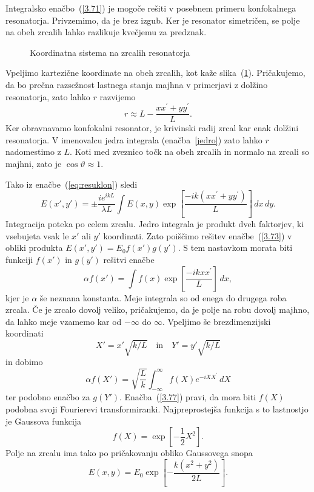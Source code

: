 Integralsko enačbo~(\ref{3.71}) je mogoče rešiti v posebnem primeru
konfokalnega resonatorja. Privzemimo, da je brez izgub. 
Ker je resonator simetričen, se polje na obeh zrcalih lahko razlikuje kvečjemu
za predznak.
\begin{figure}[h]
\centering
\def\svgwidth{110truemm} 

\caption{Koordinatna sistema na zrcalih resonatorja}
\label{fig:uklon_res_shema}
\end{figure}
Vpeljimo kartezične koordinate na obeh zrcalih, kot kaže slika~(\ref{fig:uklon_res_shema}).
Pričakujemo, da bo prečna razsežnost lastnega stanja majhna v primerjavi
z dolžino resonatorja, zato lahko $r$ razvijemo 
\begin{equation}
r\approx L-\frac{xx^{\prime}+yy^{\prime}}{L}.
\label{3.72}
\end{equation}
Ker obravnavamo konfokalni resonator, je krivinski radij zrcal kar enak dolžini resonatorja.
V imenovalcu jedra integrala (enačba~\ref{jedro}) zato lahko $r$ nadomestimo
z $L$. Koti med zveznico točk na obeh zrcalih in normalo na zrcali
so majhni, zato je  $\cos\vartheta \approx 1$. 

Tako iz enačbe~(\ref{eq:resuklon})
sledi
\begin{equation}
E(x',y')=\pm\frac{ie^{ikL}}{\lambda L}\int E(x,y)\exp
\left[\frac{-ik(xx^{\prime}+yy^{\prime})}{L}\right]\, dx\, dy.
\label{3.73}
\end{equation}
Integracija poteka po celem zrcalu. Jedro integrala je produkt dveh
faktorjev, ki vsebujeta vsak le $x'$ ali $y'$ koordinati. Zato poiščimo
rešitev enačbe~(\ref{3.73}) v obliki produkta 
$
E(x',y')=E_{0}f(x')g(y').
$
S tem nastavkom morata biti funkciji $f(x')$ in $g(y')$ rešitvi enačbe
\begin{equation}
\alpha f(x')=\int f(x)\exp\left[\frac{-ikxx^{\prime}}{L}\right]\, dx,
\label{3.75}
\end{equation}
kjer je $\alpha$ še neznana konstanta. Meje integrala so od enega do 
drugega roba zrcala. Če je zrcalo dovolj veliko,
pričakujemo, da je polje na robu dovolj majhno, da lahko meje vzamemo
kar od $-\infty$ do $\infty$. Vpeljimo še brezdimenzijski koordinati
\begin{equation}
X'=x'\sqrt{k/L} \quad \mathrm{in} \quad Y'=y'\sqrt{k/L}
\label{3.76}
\end{equation}
in dobimo
\begin{equation}
\alpha f(X')=\sqrt{\frac{L}{k}}\int_{-\infty}^{\infty}f(X)e^{-iXX^{\prime}}\, dX
\label{3.77}
\end{equation}
ter podobno enačbo za $g(Y')$. Enačba~(\ref{3.77}) pravi, da mora
biti $f(X)$ podobna svoji Fourierevi transformiranki. Najpreprostejša
funkcija s to lastnostjo je Gaussova funkcija 
\begin{equation}
f(X)=\exp[-\frac{1}{2}X^{2}].
\label{3.78}
\end{equation}
Polje na zrcalu ima tako po pričakovanju obliko Gaussovega snopa
\begin{equation}
E(x,y)=E_{0}\exp\left[-\frac{k(x^{2}+y^{2})}{2L}\right].
\label{3.79}
\end{equation}

